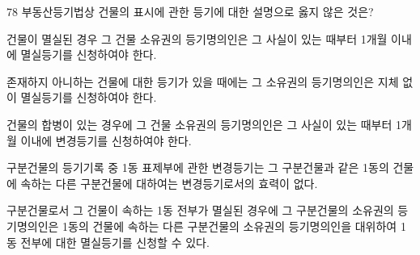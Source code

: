 \begin{question}{78}
부동산등기법상 건물의 표시에 관한 등기에 대한 설명으로 옳지 않은 것은?
\begin{choices}
  \item 건물이 멸실된 경우 그 건물 소유권의 등기명의인은 그 사실이 있는 때부터 1개월 이내에 멸실등기를 신청하여야 한다.
  \item 존재하지 아니하는 건물에 대한 등기가 있을 때에는 그 소유권의 등기명의인은 지체 없이 멸실등기를 신청하여야 한다.
  \item 건물의 합병이 있는 경우에 그 건물 소유권의 등기명의인은 그 사실이 있는 때부터 1개월 이내에 변경등기를 신청하여야 한다.
  \item 구분건물의 등기기록 중 1동 표제부에 관한 변경등기는 그 구분건물과 같은 1동의 건물에 속하는 다른 구분건물에 대하여는 변경등기로서의 효력이 없다.
  \item 구분건물로서 그 건물이 속하는 1동 전부가 멸실된 경우에 그 구분건물의 소유권의 등기명의인은 1동의 건물에 속하는 다른 구분건물의 소유권의 등기명의인을 대위하여 1동 전부에 대한 멸실등기를 신청할 수 있다.
\end{choices}
\end{question}
